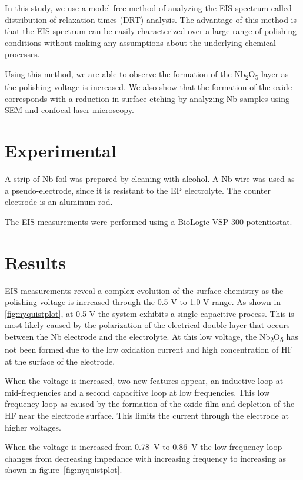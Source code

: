 \documentclass[11pt]{article}
\begin{document}
In this study, we use a model-free method of analyzing the EIS spectrum called distribution of relaxation times (DRT) analysis. The advantage of this method is that the EIS spectrum can be easily characterized over a large range of polishing conditions without making any assumptions about the underlying chemical processes. 

Using this method, we are able to observe the formation of the Nb\textsubscript{2}O\textsubscript{5} layer as the polishing voltage is increased. We also show that the formation of the oxide corresponds with a reduction in surface etching by analyzing Nb samples using SEM and confocal laser microscopy.


\section{Experimental}
\label{sec:orgb71f960}

A strip of Nb foil was prepared by cleaning with alcohol. A Nb wire was used as a pseudo-electrode, since it is resistant to the EP electrolyte. The counter electrode is an aluminum rod.

The EIS measurements were performed using a BioLogic VSP-300 potentiostat.



\section{Results}
\label{sec:org4a45003}

EIS measurements reveal a complex evolution of the surface chemistry as the polishing voltage is increased through the 0.5 V to 1.0 V range. As shown in \ref{fig:nyquistplot}, at 0.5 V the system exhibits a single capacitive process. This is most likely caused by the polarization of the electrical double-layer that occurs between the Nb electrode and the electrolyte. At this low voltage, the Nb\textsubscript{2}O\textsubscript{5} has not been formed due to the low oxidation current and high concentration of HF at the surface of the electrode.

When the voltage is increased, two new features appear, an inductive loop at mid-frequencies and a second capacitive loop at low frequencies. This low frequency loop as caused by the formation of the oxide film and depletion of the HF near the electrode surface. This limits the current through the electrode at higher voltages. 

When the voltage is increased from \qty{0.78}{\volt} to \qty{0.86}{\volt} the low frequency loop changes from decreasing impedance with increasing frequency to increasing as shown in figure~\ref{fig:nyquistplot}.
\end{document}
